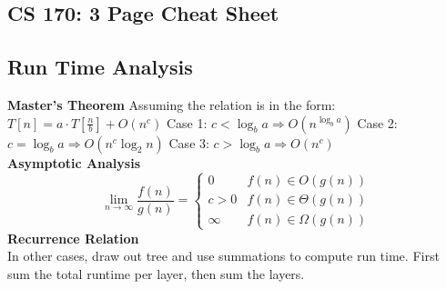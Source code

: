 \documentclass{article}
\begin{document}
\renewcommand{\thesubsection}{\thesection.\alph{subsection}}
\newcommand{\ndiv}{\hspace{-4pt}\not|\hspace{2pt}}
\begin{center}
\section*{CS 170: 3 Page Cheat Sheet}
\end{center}
\begin{multicols}{2}
\section*{Run Time Analysis}
\textbf{Master's Theorem} \newline 
Assuming the relation is in the form: $T[n] = a \cdot T[\frac{n}{b}] + O(n^c)$ \newline 
Case 1: $c < \log_b a \Longrightarrow O(n^{\log_b a})$ \newline 
Case 2: $c = \log_b a \Longrightarrow O(n^c \log_2 n)$ \newline 
Case 3: $c > \log_b a \Longrightarrow O(n^c)$ \newline \\
\textbf{Asymptotic Analysis} \\
$$\lim_{n \to \infty} \frac{f(n)}{g(n)} = \begin{cases} 
      0 & f(n) \in O(g(n)) \\
      c > 0 & f(n) \in \Theta(g(n))\\
      \infty & f(n) \in \Omega(g(n))
   \end{cases}$$
\textbf{Recurrence Relation} \\
In other cases, draw out tree and use summations to compute run time. First sum the total runtime per layer, then sum the layers. 

\end{multicols}
\end{document}
